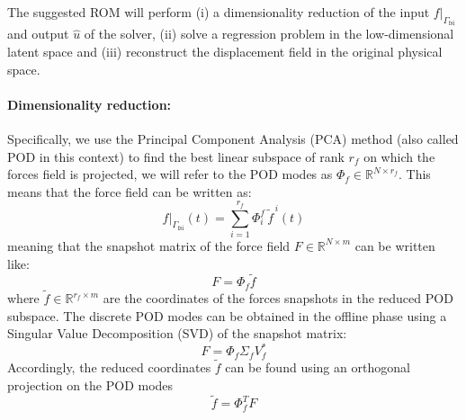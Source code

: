 \documentclass[11pt]{article}
\begin{document}
The suggested ROM will perform (i) a dimensionality reduction of the input $f|_{\Gamma_{\mathrm{fsi}}}$ and output $\hat{u}$ of the solver, (ii) solve a regression problem in the low-dimensional latent space and (iii) reconstruct the displacement field in the original physical space.

\paragraph{Dimensionality reduction:}
Specifically, we use the Principal Component Analysis (PCA) method (also called POD in this context) to find the best linear subspace of rank $r_f$ on which the forces field is projected, we will refer to the POD modes as $\Phi_f \in \mathbb{R}^{N \times r_f}$. This means that the force field can be written as:
\begin{equation}
\tag{10}
f|_{\Gamma_{\mathrm{fsi}}}(t) = \sum_{i=1}^{r_f} \Phi_i^{f}\,\tilde{f}^{\,i}(t)
\end{equation}
meaning that the snapshot matrix of the force field $F \in \mathbb{R}^{N \times m}$ can be written like:
\begin{equation}
\tag{11}
F = \Phi_f \tilde{f}
\end{equation}
where $\tilde{f} \in \mathbb{R}^{r_f \times m}$ are the coordinates of the forces snapshots in the reduced POD subspace. The discrete POD modes can be obtained in the offline phase using a Singular Value Decomposition (SVD) of the snapshot matrix:
\begin{equation}
\tag{12}
F = \Phi_f \Sigma_f V_f^{*}
\end{equation}
Accordingly, the reduced coordinates $\tilde{f}$ can be found using an orthogonal projection on the POD modes
\begin{equation}
\tag{13}
\tilde{f} = \Phi_f^{T} F
\end{equation}
\end{document}
